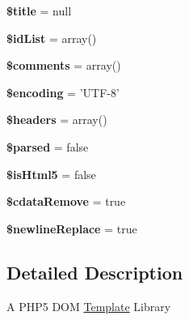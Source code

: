 \begin{DoxyCompactItemize}
\item 
\hypertarget{classDom_1_1Template_af74d07a3aef9149ffaab4da2c81e906a}{{\bfseries \$title} = null}\label{classDom_1_1Template_af74d07a3aef9149ffaab4da2c81e906a}

\item 
\hypertarget{classDom_1_1Template_ae47821d0b98de3c272ec1b61bcdb64a7}{{\bfseries \$id\+List} = array()}\label{classDom_1_1Template_ae47821d0b98de3c272ec1b61bcdb64a7}

\item 
\hypertarget{classDom_1_1Template_a2f946062dd2055bdf55d13bdfb3fb2ba}{{\bfseries \$comments} = array()}\label{classDom_1_1Template_a2f946062dd2055bdf55d13bdfb3fb2ba}

\item 
\hypertarget{classDom_1_1Template_a02bc6a7852761f7d571a790b1b932722}{{\bfseries \$encoding} = 'U\+T\+F-\/8'}\label{classDom_1_1Template_a02bc6a7852761f7d571a790b1b932722}

\item 
\hypertarget{classDom_1_1Template_a8705eaf732e6639d3cb7cf9785891756}{{\bfseries \$headers} = array()}\label{classDom_1_1Template_a8705eaf732e6639d3cb7cf9785891756}

\item 
\hypertarget{classDom_1_1Template_a81221d81a81252f84308660eca7e5d03}{{\bfseries \$parsed} = false}\label{classDom_1_1Template_a81221d81a81252f84308660eca7e5d03}

\item 
\hypertarget{classDom_1_1Template_a3c871ed96a4b5eef945e9e2f2be5b4bf}{{\bfseries \$is\+Html5} = false}\label{classDom_1_1Template_a3c871ed96a4b5eef945e9e2f2be5b4bf}

\item 
\hypertarget{classDom_1_1Template_a17ed72a7a67347e52c20448fc3c5ab18}{{\bfseries \$cdata\+Remove} = true}\label{classDom_1_1Template_a17ed72a7a67347e52c20448fc3c5ab18}

\item 
\hypertarget{classDom_1_1Template_a0c20a87d5c28772128a8fc5ff116df44}{{\bfseries \$newline\+Replace} = true}\label{classDom_1_1Template_a0c20a87d5c28772128a8fc5ff116df44}

\end{DoxyCompactItemize}


\subsection{Detailed Description}
A P\+H\+P5 D\+O\+M \hyperlink{classDom_1_1Template}{Template} Library


